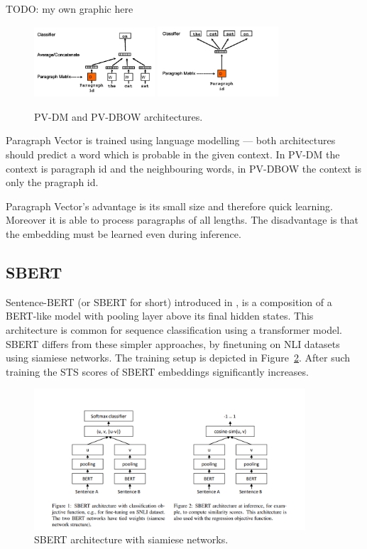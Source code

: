 TODO: my own graphic here

\begin{figure}[h]
    \centering
    \includegraphics[width=0.4\textwidth]{./img/pv-dm.png}
    \includegraphics[width=0.4\textwidth]{./img/pv-dbow.png}
    \caption{PV-DM and PV-DBOW architectures.\label{fig:pv-dm_pv-dbow}}
\end{figure}

Paragraph Vector is trained using language modelling --- both architectures should
predict a word which is probable in the given context. In PV-DM the context is
paragraph id and the neighbouring words, in PV-DBOW the context is only the
pragraph id.

Paragraph Vector's advantage is its small size and therefore quick learning.
Moreover it is able to process paragraphs of all lengths. The disadvantage is
that the embedding must be learned even during inference.

\subsection{SBERT}

Sentence-BERT (or SBERT for short) introduced in \cite{reimers2019sentence}, is
a composition of a BERT-like model with pooling layer above its final hidden
states. This architecture is common for sequence classification using a
transformer model. SBERT differs from these simpler approaches, by finetuning on
NLI datasets using siamiese networks. The training setup is depicted in
Figure~\ref{fig:sbert_siemese}. After such training the STS scores of SBERT
embeddings significantly increases.

\begin{figure}
    \centering
    \includegraphics[width=0.9\textwidth]{./img/sbert_pairs_architectures.png}
    \caption{SBERT architecture with siamiese
    networks.\label{fig:sbert_siemese}}
\end{figure}


